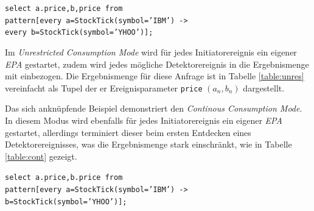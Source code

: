 \documentclass{acm_proc_article-sp}
\begin{document}
\texttt{select a.price,b,price from\\pattern[every a=StockTick(symbol='IBM') ->\\
every b=StockTick(symbol='YHOO')];}

Im \textit{Unrestricted Consumption Mode} wird für jedes Initiatorereignis ein eigener 
\textit{EPA} gestartet, zudem wird jedes mögliche Detektorereignis in die 
Ergebnismenge mit einbezogen. Die Ergebnismenge für diese Anfrage ist in Tabelle 
\ref{table:unres} vereinfacht als Tupel der er Ereignisparameter \texttt{price} 
$(a_n,b_n)$ dargestellt. 


\begin{table}[ht]
    \caption{\textit{Unrestricted Consumption Mode}}
    \label{table:unres}\vspace{0.2cm}
\end{table}


Das sich anknüpfende Beispiel demonstriert den \textit{Continous Consumption Mode}. In 
diesem Modus wird ebenfalls für jedes Initiatorereignis ein eigener \textit{EPA} 
gestartet, allerdings terminiert dieser beim ersten Entdecken eines Detektorereignisses, 
was die Ergebnismenge stark einschränkt, wie in Tabelle \ref{table:cont} gezeigt.
 
\texttt{select a.price,b.price from\\pattern[every a=StockTick(symbol='IBM') ->\\
b=StockTick(symbol='YHOO')];}
\end{document}
